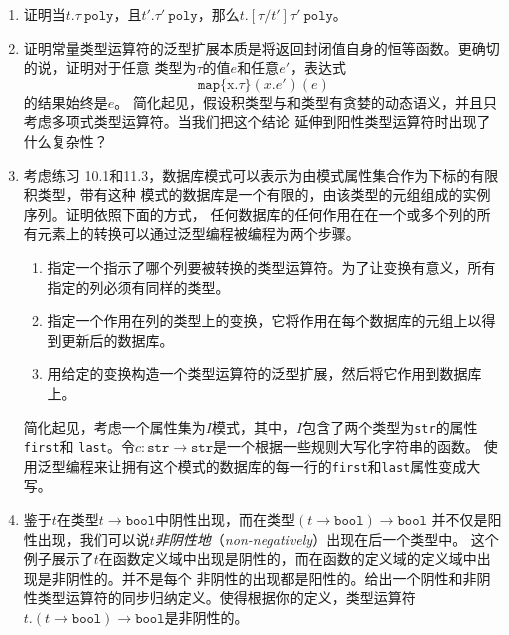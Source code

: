 \begin{enumerate}
	\item 证明当$t.\tau\ \texttt{poly}$，且$t'.\tau'\ \texttt{poly}$，那么$t.[\tau/t']\tau'\ \texttt{poly}$。
	\item 证明常量类型运算符的泛型扩展本质是将返回封闭值自身的恒等函数。更确切的说，证明对于任意
	类型为$\tau$的值$e$和任意$e'$，表达式$$\texttt{map}\{\text{x}.\tau\}(x.e')(e)$$的结果始终是$e$。
	简化起见，假设积类型与和类型有贪婪的动态语义，并且只考虑多项式类型运算符。当我们把这个结论
	延伸到阳性类型运算符时出现了什么复杂性？
	\item 考虑练习 10.1和11.3，数据库模式可以表示为由模式属性集合作为下标的有限积类型，带有这种
	模式的数据库是一个有限的，由该类型的元组组成的实例序列。证明依照下面的方式，
	任何数据库的任何作用在在一个或多个列的所有元素上的转换可以通过泛型编程被编程为两个步骤。
	
	\begin{enumerate}
		\renewcommand{\theenumi}{\alph{enumi}}
		\item 指定一个指示了哪个列要被转换的类型运算符。为了让变换有意义，所有指定的列必须有同样的类型。
		\item 指定一个作用在列的类型上的变换，它将作用在每个数据库的元组上以得到更新后的数据库。
		\item 用给定的变换构造一个类型运算符的泛型扩展，然后将它作用到数据库上。
	\end{enumerate}
    
    简化起见，考虑一个属性集为$I$模式，其中，$I$包含了两个类型为\texttt{str}的属性\texttt{first}和
    \texttt{last}。令$c:\texttt{str}\rightarrow\texttt{str}$是一个根据一些规则大写化字符串的函数。
    使用泛型编程来让拥有这个模式的数据库的每一行的\texttt{first}和\texttt{last}属性变成大写。
    
	\item 鉴于$t$在类型$t\rightarrow\texttt{bool}$中阴性出现，而在类型$(t\rightarrow\texttt{bool})\rightarrow\texttt{bool}$
	并不仅是阳性出现，我们可以说$t$\textit{非阴性地}（\textit{non-negatively}）出现在后一个类型中。
	这个例子展示了$t$在函数定义域中出现是阴性的，而在函数的定义域的定义域中出现是非阴性的。并不是每个
	非阴性的出现都是阳性的。给出一个阴性和非阴性类型运算符的同步归纳定义。使得根据你的定义，类型运算符
	$t.(t\rightarrow\texttt{bool})\rightarrow\texttt{bool}$是非阴性的。
	

\end{enumerate}
